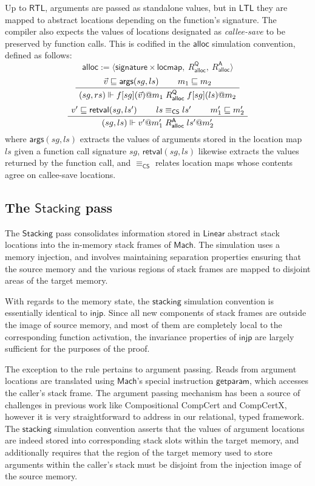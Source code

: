 \documentclass[sigplan,10pt,review,anonymous]{acmart}\settopmatter{printfolios=true,printccs=false,printacmref=false}
\newcommand{\kw}[1]{\ensuremath{ \mathsf{#1} }}
\begin{document}
Up to \kw{RTL},
arguments are passed as standalone values,
but in \kw{LTL}
they are mapped to abstract locations
depending on the function's signature.
The compiler also expects the values of
locations designated as \emph{callee-save}
to be preserved by function calls.
This is codified in the $\kw{alloc}$
simulation convention, defined as follows:
\[
  \kw{alloc} := \langle
      \kw{signature} \times \kw{locmap}, \:
      R_\kw{alloc}^\kw{Q}, \:
      R_\kw{alloc}^\kw{A} \rangle
\]
\[
  \AxiomC{$\vec{v} \sqsubseteq \kw{args}(sg, ls)$}
  \AxiomC{$m_1 \sqsubseteq m_2$}
  \BinaryInfC{$
      (sg, rs) \Vdash
      f[sg](\vec{v})@m_1
      \mathrel{R_\kw{alloc}^\kw{Q}}
      f[sg](ls)@m_2$}
  \DisplayProof
\]
\vspace{0.5ex}
\[
  \AxiomC{$v' \sqsubseteq \kw{retval}(sg, ls')$}
  \AxiomC{$ls \equiv_\kw{CS} ls'$}
  \AxiomC{$m_1' \sqsubseteq m_2'$}
  \TrinaryInfC{$
      (sg, ls) \Vdash
      v'@m_1'
      \mathrel{R_\kw{alloc}^\kw{A}}
      ls'@m_2'$}
  \DisplayProof
\]
where $\kw{args}(sg, ls)$ extracts the values of arguments
stored in the location map $ls$ given a function call signature $sg$,
$\kw{retval}(sg, ls)$ likewise extracts the
values returned by the function call, and
$\equiv_\kw{CS}$ relates location maps whose contents agree
on callee-save locations.


\subsection{The \kw{Stacking} pass} %

The \kw{Stacking} pass
consolidates information stored in
\kw{Linear} abstract stack locations
into the in-memory stack frames of \kw{Mach}.
The simulation uses a memory injection,
and involves maintaining separation properties
ensuring that the source memory and
the various regions of stack frames
are mapped to disjoint areas of the target memory.

With regards to the memory state,
the \kw{stacking} simulation convention
is essentially identical to \kw{injp}.
Since all new components of stack frames
are outside the image of source memory,
and most of them are completely local to
the corresponding function activation,
the invariance properties of \kw{injp}
are largely sufficient for the purposes of the proof.

The exception to the rule pertains to argument passing.
Reads from argument locations are translated
using \kw{Mach}'s special instruction \kw{getparam},
which accesses the caller's stack frame.
The argument passing mechanism has been a source of challenges
in previous work like Compositional CompCert and CompCertX,
however it is very straightforward to address
in our relational, typed framework.
The \kw{stacking} simulation convention
asserts that the values of argument locations
are indeed stored into corresponding stack slots
within the target memory,
and additionally
requires that the region of the target memory
used to store arguments within the caller's stack
must be disjoint from the injection image of the source memory.
\end{document}
